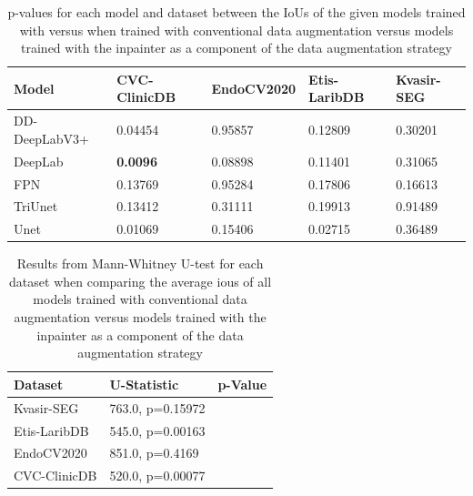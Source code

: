 \begin{table}[htb]
    \centering
    \begin{tabularx}{\linewidth}{lXXXX}
    \toprule
     Model & CVC-ClinicDB & EndoCV2020 & Etis-LaribDB & Kvasir-SEG\\
    \midrule
    DD-DeepLabV3+ & 0.04454 & 0.95857 & 0.12809 & 0.30201\\ 
    DeepLab & \textbf{0.0096} & 0.08898 & 0.11401 & 0.31065\\ 
    FPN & 0.13769 & 0.95284 & 0.17806 & 0.16613\\ 
    TriUnet & 0.13412 & 0.31111 & 0.19913 & 0.91489\\ 
    Unet & 0.01069 & 0.15406 & 0.02715 & 0.36489\\ 
      \bottomrule
    \end{tabularx}
    \caption[T-test results inpainting]{p-values for each model and dataset between the IoUs of the given models trained with  versus when trained with conventional data augmentation versus models trained with the inpainter as a component of the data augmentation strategy}
    \label{tab:ttest_per_dataset_inpainter}
\end{table}
\begin{table}[htb]
    \centering
    \begin{tabularx}{\linewidth}{lXr}
        \toprule
        Dataset & U-Statistic & p-Value \\
        \midrule
            Kvasir-SEG & 763.0, p=0.15972 \\ 
            Etis-LaribDB & 545.0, p=0.00163 \\ 
            EndoCV2020 & 851.0, p=0.4169 \\ 
            CVC-ClinicDB & 520.0, p=0.00077 \\ 
        \bottomrule
    \end{tabularx}
    \caption[Mann-Whitney U-test results inpainter averaged across models]{Results from Mann-Whitney U-test for each dataset when comparing the average \glspl{iou} of all models trained with conventional data augmentation versus models trained with the inpainter as a component of the data augmentation strategy}
    \label{tab:ttest_avgs_inpainter}
\end{table}

